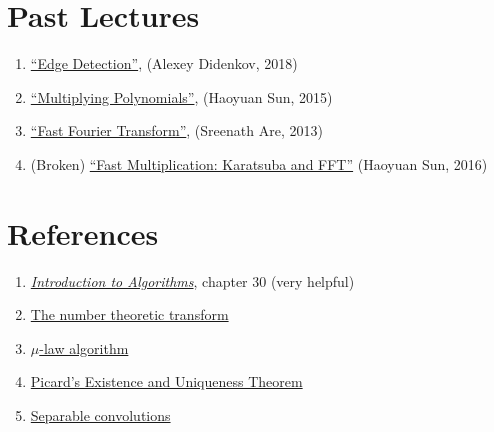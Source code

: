 \documentclass[11pt, oneside]{article}
\theoremstyle{plain}
\theoremstyle{definition}
\begin{document}
\newpage

\section{Past Lectures}
\begin{enumerate}
  \item \href{https://activities.tjhsst.edu/computervision/lectures/Edge_Detection.pdf}
    {\enquote{Edge Detection}}, (Alexey Didenkov, 2018)
  \item \href{https://activities.tjhsst.edu/sct/lectures/1415/SCT_Multiplying_Polynomials.pdf}
    {\enquote{Multiplying Polynomials}}, (Haoyuan Sun, 2015)
  \item \href{https://activities.tjhsst.edu/sct/lectures/1213/fft.pdf}
    {\enquote{Fast Fourier Transform}}, (Sreenath Are, 2013)
  \item (Broken) \href{https://activities.tjhsst.edu/sct/lectures/1516/SCT_Polynomial.pdf}
    {\enquote{Fast Multiplication: Karatsuba and FFT}} (Haoyuan Sun, 2016)
\end{enumerate}

\section{References}

\begin{enumerate}
  \item \href{https://mitpress.mit.edu/books/introduction-algorithms-third-edition}
    {\textit{Introduction to Algorithms}}, chapter 30 (very helpful)
  \item \href{https://www.nayuki.io/page/number-theoretic-transform-integer-dft}
    {The number theoretic transform}
  \item \href{https://en.wikipedia.org/wiki/%CE%9C-law_algorithm}
    {\( \mu \)-law algorithm}
  \item \href{https://ptolemy.berkeley.edu/projects/embedded/eecsx44/lectures/Spring2013/Picard.pdf}
    {Picard's Existence and Uniqueness Theorem}
  \item \href{https://towardsdatascience.com/a-basic-introduction-to-separable-convolutions-b99ec3102728}
    {Separable convolutions}
\end{enumerate}

\end{document}
